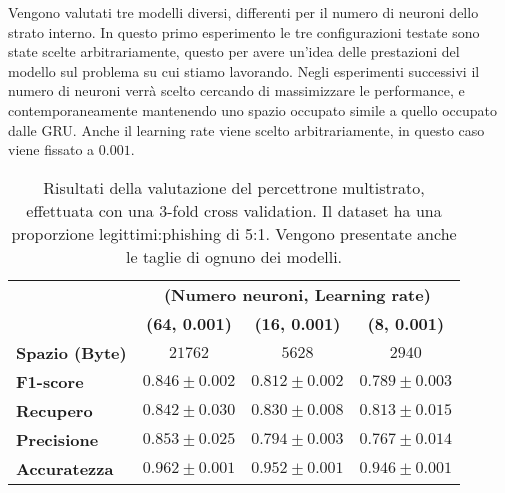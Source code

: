 \documentclass[../../main.tex]{subfiles}
\begin{document}
    Vengono valutati tre modelli diversi, differenti per il numero di neuroni dello strato interno. In questo primo esperimento le tre configurazioni testate sono state scelte arbitrariamente, questo per avere un'idea delle prestazioni del modello sul problema su cui stiamo lavorando. Negli esperimenti successivi il numero di neuroni verrà scelto cercando di massimizzare le performance, e contemporaneamente mantenendo uno spazio occupato simile a quello occupato dalle GRU. Anche il learning rate viene scelto arbitrariamente, in questo caso viene fissato a $0.001$.

    \begin{table}[H]
        \centering
        \begin{tabular}{lccc}
            \toprule
            {} &                      \multicolumn{3}{c}{\textbf{(Numero neuroni, Learning rate)}}\\
            {} &                      \textbf{(64, 0.001)} & \textbf{(16, 0.001)} & \textbf{(8, 0.001)} \\
            \midrule
            \textbf{Spazio (Byte)}  &      $21762$ & $5628$ & $2940$\\
            \midrule
            \textbf{F1-score }      &      $0.846 \pm 0.002$ & $0.812 \pm 0.002$ & $0.789 \pm 0.003$\\
            \textbf{Recupero   }    &      $0.842 \pm 0.030$ & $0.830 \pm 0.008$ & $0.813 \pm 0.015$\\
            \textbf{Precisione}     &      $0.853 \pm 0.025$ & $0.794 \pm 0.003$ & $0.767 \pm 0.014$\\
            \textbf{Accuratezza}    &      $0.962 \pm 0.001$ & $0.952 \pm 0.001$ & $0.946 \pm 0.001$\\
            \bottomrule            
        \end{tabular}
        \caption{Risultati della valutazione del percettrone multistrato, effettuata con una 3-fold cross validation. Il dataset ha una proporzione legittimi:phishing di 5:1. Vengono presentate anche le taglie di ognuno dei modelli.}
        \label{tab:FFNNModelSelection}
    \end{table}
\end{document}
